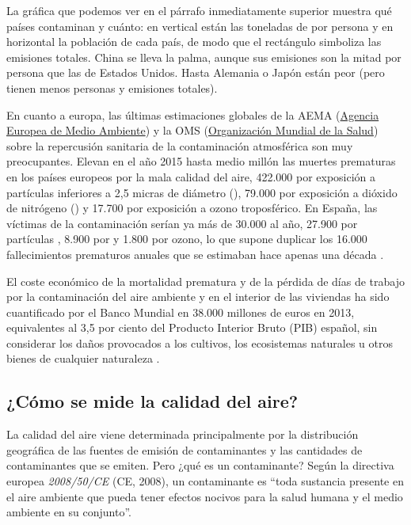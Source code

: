 
La gráfica que podemos ver en el párrafo inmediatamente superior  muestra qué países contaminan y cuánto: en vertical están las toneladas de  por persona y en horizontal la población de cada país, de modo que el rectángulo simboliza las emisiones totales. China se lleva la palma, aunque sus emisiones son la mitad por persona que las de Estados Unidos. Hasta Alemania o Japón están peor (pero tienen menos personas y emisiones totales). 

En cuanto a europa, las últimas estimaciones globales de la AEMA (\href{https://www.eea.europa.eu/}{Agencia Europea de Medio Ambiente}) y la OMS (\href{https://www.who.int/}{Organización Mundial de la Salud}) sobre la repercusión sanitaria de la contaminación atmosférica son muy preocupantes. Elevan en el año 2015 hasta medio millón las muertes prematuras en los países europeos por la mala calidad del aire, 422.000 por exposición a partículas inferiores a 2,5 micras de diámetro (), 79.000 por exposición a dióxido de nitrógeno () y 17.700 por exposición a ozono troposférico. En España, las víctimas de la contaminación serían ya más de 30.000 al año, 27.900 por partículas , 8.900 por  y 1.800 por ozono, lo que supone duplicar los 16.000 fallecimientos prematuros anuales que se estimaban hace apenas una década \cite{informe_ecologistas}.

El coste económico de la mortalidad prematura y de la pérdida de días de trabajo por la contaminación del aire ambiente y en el interior de las viviendas ha sido cuantificado por el Banco Mundial en 38.000 millones de euros en 2013, equivalentes al 3,5 por ciento del Producto Interior Bruto (PIB) español, sin considerar los daños provocados a los cultivos, los ecosistemas naturales u otros bienes de cualquier naturaleza  \cite{informe_ecologistas}.



 \subsection{¿Cómo se mide la calidad del aire?}
 
 La calidad del aire viene determinada principalmente por la distribución geográfica de las fuentes de emisión de contaminantes y las cantidades de contaminantes que se emiten. Pero ¿qué es un contaminante? Según la directiva europea \textit{2008/50/CE} (CE, 2008), un contaminante es “toda sustancia presente en el aire ambiente que pueda tener efectos nocivos para la salud humana y el medio ambiente en su conjunto”. 
 
